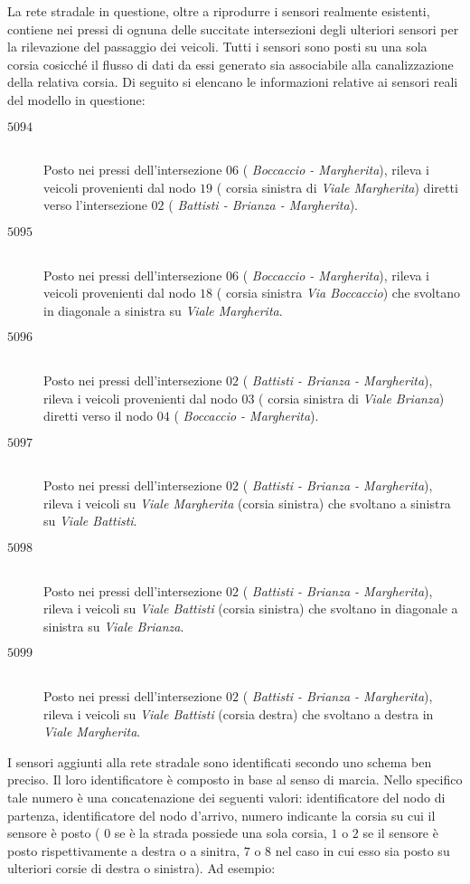 La rete stradale in questione, oltre a riprodurre i sensori realmente esistenti, contiene nei pressi di ognuna delle succitate intersezioni degli ulteriori sensori per la rilevazione del passaggio dei veicoli. Tutti i sensori sono posti su una sola corsia cosicché il flusso di dati da essi generato sia associabile alla canalizzazione della relativa corsia. Di seguito si elencano le informazioni relative ai sensori reali del modello in questione:
\begin{description}
\item[$5094$] \hfill \\
Posto nei pressi dell'intersezione $06$ (\ie{} \emph{Boccaccio - Margherita}), rileva i veicoli provenienti dal nodo $19$ (\ie{} corsia sinistra di \emph{Viale Margherita}) diretti verso l'intersezione $02$ (\ie{} \emph{Battisti - Brianza - Margherita}).
\item[$5095$] \hfill \\
Posto nei pressi dell'intersezione $06$ (\ie{} \emph{Boccaccio - Margherita}), rileva i veicoli provenienti dal nodo $18$ (\ie{} corsia sinistra \emph{Via Boccaccio}) che svoltano in diagonale a sinistra su \emph{Viale Margherita}.
\item[$5096$] \hfill \\
Posto nei pressi dell'intersezione $02$ (\ie{} \emph{Battisti - Brianza - Margherita}), rileva i veicoli provenienti dal nodo $03$ (\ie{} corsia sinistra di \emph{Viale Brianza}) diretti verso il nodo $04$ (\ie{} \emph{Boccaccio - Margherita}).
\item[$5097$] \hfill \\
Posto nei pressi dell'intersezione $02$ (\ie{} \emph{Battisti - Brianza - Margherita}), rileva i veicoli su \emph{Viale Margherita} (corsia sinistra) che svoltano a sinistra su \emph{Viale Battisti}.
\item[$5098$] \hfill \\
Posto nei pressi dell'intersezione $02$ (\ie{} \emph{Battisti - Brianza - Margherita}), rileva i veicoli su \emph{Viale Battisti} (corsia sinistra) che svoltano in diagonale a sinistra su \emph{Viale Brianza}.
\item[$5099$] \hfill \\
Posto nei pressi dell'intersezione $02$ (\ie{} \emph{Battisti - Brianza - Margherita}), rileva i veicoli su \emph{Viale Battisti} (corsia destra) che svoltano a destra in \emph{Viale Margherita}.
\end{description}
I sensori aggiunti alla rete stradale sono identificati secondo uno schema ben preciso. Il loro identificatore è composto in base al senso di marcia. Nello specifico tale numero è una concatenazione dei seguenti valori: identificatore del nodo di partenza, identificatore del nodo d'arrivo, numero indicante la corsia su cui il sensore è posto (\ie{} $0$ se è la strada possiede una sola corsia, $1$ o $2$ se il sensore è posto rispettivamente a destra o a sinitra, $7$ o $8$ nel caso in cui esso sia posto su ulteriori corsie di destra o sinistra). Ad esempio:
